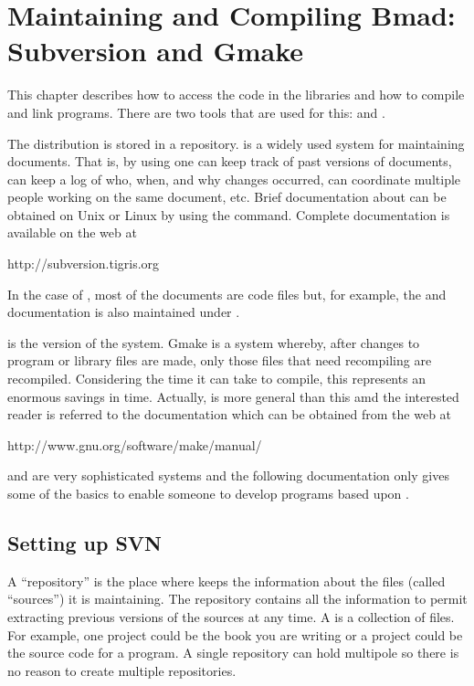 \chapter{Maintaining and Compiling Bmad: Subversion and Gmake}
\label{c:svn.gmake}

This chapter describes how to access the code in the \bmad libraries 
and how to compile and link programs. There are two tools that are used
for this: \svn and . 

The \bmad distribution is stored in a \svn repository. \svn
is a widely used system for maintaining
documents. That is, by using \svn one can keep track of past
versions of documents, can keep a log of who, when, and why changes
occurred, can coordinate multiple people working on the same document,
etc.  Brief documentation about \svn can be obtained on Unix or Linux by
using the  command. Complete documentation is available on
the web at
\begin{example}
  http://subversion.tigris.org
\end{example}
In the case of \bmad, most of the documents are code files but, for
example, the \bmad and \tao documentation is also maintained under
\svn.

 is the  version of the  system. Gmake is a
system whereby, after changes to program or library files are made,
only those files that need recompiling are recompiled. Considering the
time it can take to compile, this represents an enormous savings in
time. Actually,  is more general than this amd the 
interested reader is referred to the
 documentation which can be obtained from the web at
\begin{example}
  http://www.gnu.org/software/make/manual/
\end{example}

\svn and  are very sophisticated systems and the following
documentation only gives some of the basics to enable someone to
develop programs based upon \bmad.

\section{Setting up SVN}
\label{s:svn.setup}

A ``repository'' is the place where \svn keeps the information
about the files (called ``sources'') it is maintaining. The repository
contains all the information to permit extracting previous versions of
the sources at any time. A  is a collection of files. For example,
one project could be the book you are writing or a project could be the 
source code for a program.
A single repository can hold multipole  so
there is no reason to create multiple repositories. 

